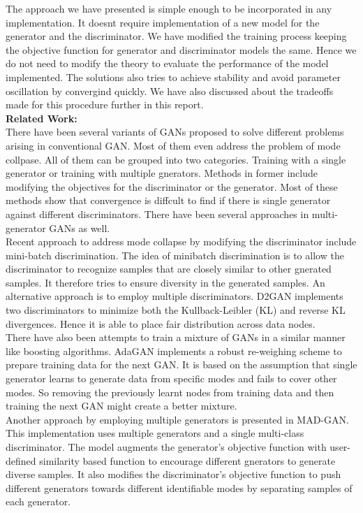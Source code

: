 \documentclass[12pt]{article}
\begin{document}
The approach we have presented is simple enough to be incorporated in any implementation. It doesnt require implementation of a new model for the generator and the discriminator. We have modified the training process keeping the objective function for generator and discriminator models the same. Hence we do not need to modify the theory to evaluate the performance of the model implemented. The solutions also tries to achieve stability and avoid parameter oscillation by convergind quickly. We have also discussed about the tradeoffs made for this procedure further in this report.\\

\noindent \textbf{Related Work:}\\

There have been several variants of GANs proposed to solve different problems arising in conventional GAN. Most of them even address the problem of mode collpase. All of them can be grouped into two categories. Training with a single generator or training with multiple gnerators. Methods in former include modifying the objectives for the discriminator or the generator. Most of these methods show that convergence is diffcult to find if there is single generator against different discriminators. There have been several approaches in multi-generator GANs as well.\\

Recent approach to address mode collapse by modifying the discriminator include mini-batch discrimination. The idea of minibatch discrimination is to allow the discriminator to recognize samples that are closely similar to other gnerated samples. It therefore tries to ensure diversity in the generated samples. An alternative approach is to employ multiple discriminators. D2GAN implements two discriminators to minimize both the Kullback-Leibler (KL) and reverse KL divergences. Hence it is able to place fair distribution across data nodes.\\

There have also been attempts to train a mixture of GANs in a similar manner like boosting algorithms. AdaGAN implements a robust re-weighing scheme to prepare training data for the next GAN. It is based on the assumption that single generator learns to generate data from specific modes and fails to cover other modes. So removing the previously learnt nodes from training data and then training the next GAN might create a better mixture.\\

Another approach by employing multiple generators is presented in MAD-GAN. This implementation uses multiple generators and a single multi-class discriminator. The model augments the generator's objective function with user-defined similarity based function to encourage different gnerators to generate diverse samples. It also modifies the discriminator's objective function to push different generators towards different identifiable modes by separating samples of each generator.\\
\end{document}
